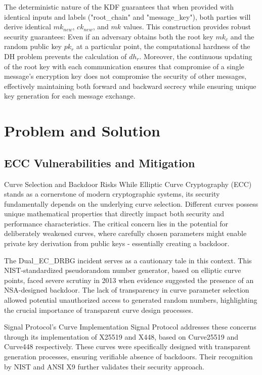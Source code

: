 \documentclass[9pt,a4paper,twoside]{rho-class/rho}
\begin{document}
The deterministic nature of the KDF guarantees that when provided with identical inputs and labels ("root\_chain" and "message\_key"), both parties will derive identical $mk_{new}$, $ck_{new}$, and $mk$ values. This construction provides robust security guarantees: Even if an adversary obtains both the root key $mk_c$ and the random public key $pk_r$ at a particular point, the computational hardness of the DH problem prevents the calculation of $dh_r$. Moreover, the continuous updating of the root key with each communication ensures that compromise of a single message's encryption key does not compromise the security of other messages, effectively maintaining both forward and backward secrecy while ensuring unique key generation for each message exchange.

\section{Problem and Solution}
\subsection{ECC Vulnerabilities and Mitigation}

Curve Selection and Backdoor Risks
While Elliptic Curve Cryptography (ECC) stands as a cornerstone of modern cryptographic systems, its security fundamentally depends on the underlying curve selection. Different curves possess unique mathematical properties that directly impact both security and performance characteristics. The critical concern lies in the potential for deliberately weakened curves, where carefully chosen parameters might enable private key derivation from public keys - essentially creating a backdoor.

The Dual\_EC\_DRBG incident serves as a cautionary tale in this context. This NIST-standardized pseudorandom number generator, based on elliptic curve points, faced severe scrutiny in 2013 when evidence suggested the presence of an NSA-designed backdoor. The lack of transparency in curve parameter selection allowed potential unauthorized access to generated random numbers, highlighting the crucial importance of transparent curve design processes.

Signal Protocol's Curve Implementation
Signal Protocol addresses these concerns through its implementation of X25519 and X448, based on Curve25519 and Curve448 respectively. These curves were specifically designed with transparent generation processes, ensuring verifiable absence of backdoors. Their recognition by NIST and ANSI X9 further validates their security approach.
\end{document}
